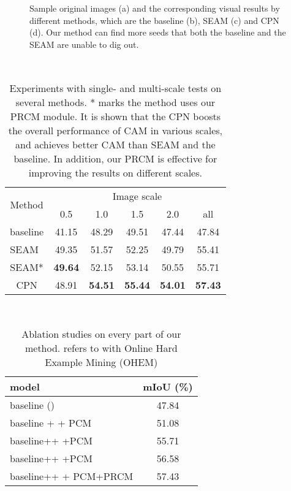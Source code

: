 \documentclass[10pt,twocolumn,letterpaper]{article}
\begin{document}
\begin{figure*}[htbp]
\centering
\caption{Sample original images (a) and the corresponding visual results by different methods, which are the baseline (b), SEAM (c) and CPN (d). Our method can find more seeds that both the baseline and the SEAM are unable to dig out.}
\label{fig:compare_fig}
\end{figure*}

\begin{table}[!htbp]\small
\centering\
\begin{tabular}{c|c|c|c|c|c}
\hline
\multirow{2}{*}{Method} &
\multicolumn{5}{|c}{Image scale}\\
\cline{2-6}
  & 0.5 & 1.0 & 1.5 & 2.0 & all\\
\hline
baseline &41.15&48.29&49.51&47.44&47.84\\
SEAM~\cite{seam} & 49.35 & 51.57 & 52.25 & 49.79 & 55.41\\
SEAM* & \textbf{49.64}& 52.15& 53.14 & 50.55 & 55.71\\
CPN &48.91& \textbf{54.51} &\textbf{ 55.44} & \textbf{54.01} & \textbf{57.43}\\
\hline
\end{tabular}
\caption{Experiments with single- and multi-scale tests on several methods. * marks the method uses our PRCM module. It is shown that the CPN boosts the overall performance of CAM in various scales, and achieves better CAM than SEAM and the baseline. In addition, our PRCM is effective for improving the results on different scales.}
\label{tab:scale}
\end{table}

\begin{table}[!htbp]\small
\centering\
\begin{tabular}{lc}
\hline
model& mIoU (\%)\\
\hline
baseline ()   &     47.84\\
\hline
baseline +  + PCM & 51.08\\
baseline++ +PCM & 55.71\\
baseline++ +PCM & 56.58\\
baseline++  + PCM+PRCM & 57.43\\
\hline
\end{tabular}
\caption{Ablation studies on every part of our method.  refers to  with Online Hard Example Mining (OHEM) }
\label{tab:ablation on cpn}
\end{table}
\end{document}

